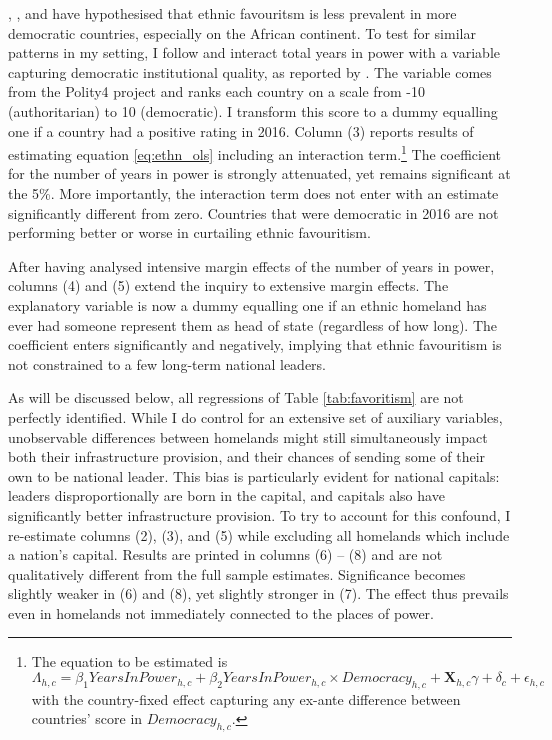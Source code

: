 \documentclass[11pt, oneside]{article}   	%
\begin{document}
\cite{DeLuca_Ethnicfavoritismaxiom_2018}, \cite{Hodler_RegionalFavoritism_2014}, and \cite{burgess_value_2015} have hypothesised that ethnic favouritsm is less prevalent in more democratic countries, especially on the African continent. To test for similar patterns in my setting, I follow \citeauthor{DeLuca_Ethnicfavoritismaxiom_2018} and interact total years in power with a variable capturing democratic institutional quality, as reported by \cite{Marshall_PolityProjectCenter_2015}. The variable comes from the Polity4 project and ranks each country on a scale from -10 (authoritarian) to 10 (democratic). I transform this score to a dummy equalling one if a country had a positive rating in 2016. Column (3) reports results of estimating equation \eqref{eq:ethn_ols} including an interaction term.\footnote{The equation to be estimated is \begin{equation*}
  \Lambda_{h,c} = \beta_{1} YearsInPower_{h,c} + \beta_{2} YearsInPower_{h,c}\times Democracy_{h,c} + \textbf{X}_{h,c}\gamma + \delta_{c} + \epsilon_{h,c}
\end{equation*} with the country-fixed effect capturing any ex-ante difference between countries' score in $Democracy_{h,c}$.} The coefficient for the number of years in power is strongly attenuated, yet remains significant at the 5\%. More importantly, the interaction term does not enter with an estimate significantly different from zero. Countries that were democratic in 2016 are not performing better or worse in curtailing ethnic favouritism.

After having analysed intensive margin effects of the number of years in power, columns (4) and (5) extend the inquiry to extensive margin effects. The explanatory variable is now a dummy equalling one if an ethnic homeland has ever had someone represent them as head of state (regardless of how long). The coefficient enters significantly and negatively, implying that ethnic favouritism is not constrained to a few long-term national leaders.

As will be discussed below, all regressions of Table \eqref{tab:favoritism} are not perfectly identified. While I do control for an extensive set of auxiliary variables, unobservable differences between homelands might still simultaneously impact both their infrastructure provision, and their chances of sending some of their own to be national leader. This bias is particularly evident for national capitals: leaders disproportionally are born in the capital, and capitals also have significantly better infrastructure provision. To try to account for this confound, I re-estimate columns (2), (3), and (5) while excluding all homelands which include a nation's capital. Results are printed in columns (6) -- (8) and are not qualitatively different from the full sample estimates. Significance becomes slightly weaker in (6) and (8), yet slightly stronger in (7). The effect thus prevails even in homelands not immediately connected to the places of power.
\end{document}
